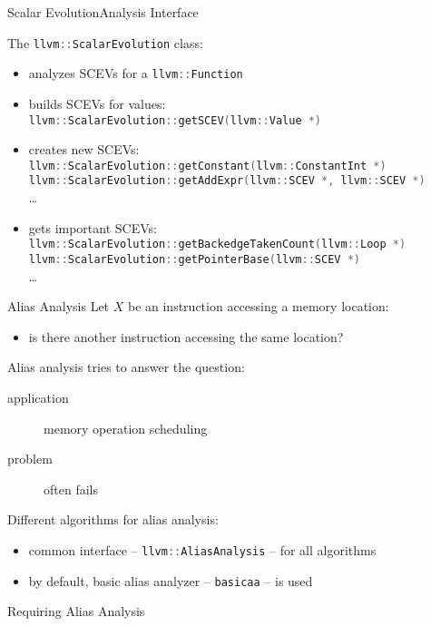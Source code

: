\documentclass[10pt,mathserif]{beamer}
\newcommand{\cppinput}[1]{}
\newcommand{\cppinline}[1]{\lstinline[language=C++]!#1!}
\begin{document}
\begin{frame}{Scalar Evolution}{Analysis Interface}

The \cppinline{llvm::ScalarEvolution} class:

\begin{itemize}
\item analyzes SCEVs for a \cppinline{llvm::Function}
\vfill
\item builds SCEVs for values: \\
      \cppinline{llvm::ScalarEvolution::getSCEV(llvm::Value *)}
\vfill
\item creates new SCEVs: \\
\cppinline{llvm::ScalarEvolution::getConstant(llvm::ConstantInt *)} \\
\cppinline{llvm::ScalarEvolution::getAddExpr(llvm::SCEV *, llvm::SCEV *)} \\
\ldots
\vfill
\item gets important SCEVs: \\
      \cppinline{llvm::ScalarEvolution::getBackedgeTakenCount(llvm::Loop *)} \\
      \cppinline{llvm::ScalarEvolution::getPointerBase(llvm::SCEV *)} \\
      \ldots
\end{itemize}
\end{frame}


\begin{frame}{Alias Analysis}
Let $X$ be an instruction accessing a memory location:

\begin{itemize}
\item is there another instruction accessing the same location?
\end{itemize}

\vfill
Alias analysis tries to answer the question:

\begin{description}
\item[application] memory operation scheduling
\item[problem] often fails
\end{description}

\vfill
Different algorithms for alias analysis:

\begin{itemize}
\item common interface -- \cppinline{llvm::AliasAnalysis} -- for all algorithms
\item by default, basic alias analyzer -- \texttt{basicaa} -- is used
\end{itemize}

\begin{block}{Requiring Alias Analysis}
\centering
\cppinput{snippet/02/requiring-alias-analysis.cpp}
\end{block}
\end{frame}
\end{document}

